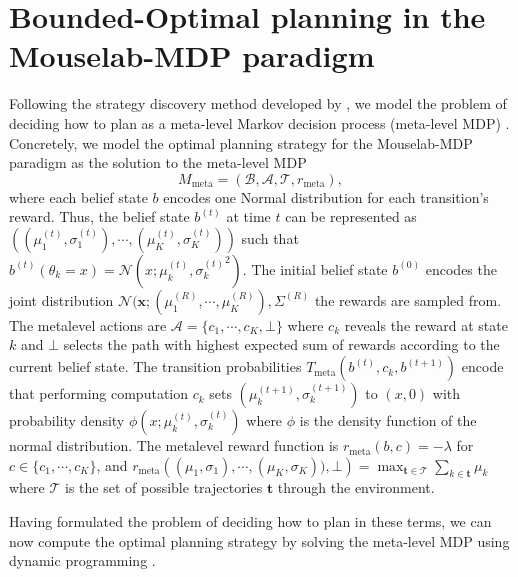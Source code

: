\newcommand{\A}{\mathcal{A}}
\newcommand{\B}{\mathcal{B}}
\newcommand{\T}{\mathcal{T}}
\newcommand{\meta}{_{\text{meta}}}
\newcommand{\Qmeta}{$Q\meta ^\star$}
\newcommand{\expect}[1]{\mathds{E} \left[ #1 \right]}

\section{Bounded-Optimal planning in the Mouselab-MDP paradigm}
\label{sec:mouselab_mdp}


Following the strategy discovery method developed by \cite{LiederCallawayGulKruegerGriffiths2017}, we model the problem of deciding how to plan as a meta-level Markov decision process (meta-level MDP) \cite{Hay2012}.
Concretely, we model the optimal planning strategy for the Mouselab-MDP paradigm as the solution to the meta-level MDP
\begin{equation}
    M\meta = (\B, \A, \T, r\meta),\label{eq:MouselabMDPMetaMDP}
\end{equation}
where each belief state $b$ encodes one Normal distribution for each transition's reward. Thus, the belief state $b^{(t)}$ at time $t$ can be represented as $((\mu_1^{(t)},\sigma_1^{(t)}), \cdots, (\mu_K^{(t)},\sigma_K^{(t)}))$ such that $b^{(t)}(\theta_k=x)=\mathcal{N}(x; \mu_k^{(t)}, {\sigma_k^{(t)}}^2)$.
The initial belief state $b^{(0)}$ encodes the joint distribution $\mathcal{N}(\mathbf{x}; (\mu^{(R)}_1,\cdots,\mu^{(R)}_K), \Sigma^{(R)}$ the rewards are sampled from. 
The metalevel actions are $\A = \{c_1, \cdots, c_K, \bot\}$ where $c_k$ reveals the reward at state $k$ and $\bot$ selects the path with highest expected sum of rewards according to the current belief state.
The transition probabilities $T\meta(b^{(t)}, c_k, b^{(t+1)})$ encode that performing computation $c_k$ sets $(\mu_k^{(t+1)}, \sigma_k^{(t+1)})$ to $(x,0)$ with probability density $\phi(x;\mu_k^{(t)},\sigma_k^{(t)})$ where $\phi$ is the density function of the normal distribution.
The metalevel reward function is $r\meta(b, c) = -\lambda$ for $c \in \{c_1,\cdots, c_K \}$, and $r\meta\left( (\mu_1,\sigma_1),\cdots, (\mu_K,\sigma_K)), \bot\right) = \max_{\mathbf{t}\in \mathcal{T}} \sum_{k \in \mathbf{t}} \mu_k$ where $\mathcal{T}$ is the set of possible trajectories $\mathbf{t}$ through the environment.



Having formulated the problem of deciding how to plan in these terms, we can now compute the optimal planning strategy by solving the meta-level MDP using dynamic programming \cite{Puterman2014}.

